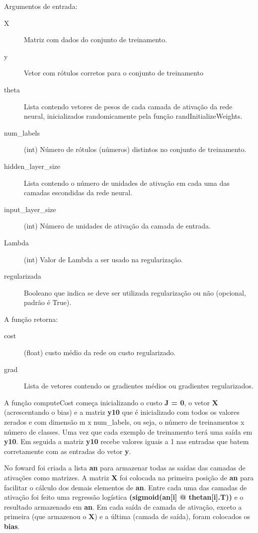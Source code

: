 \documentclass[12pt]{article}
\begin{document}
Argumentos de entrada: 
\begin{description}
\item[X] Matriz com dados do conjunto de treinamento.
\item[y] Vetor com rótulos corretos para o conjunto de treinamento
\item[theta] Lista contendo vetores de pesos de cada camada de ativação da rede neural, inicializados randomicamente pela função randInitializeWeights. 
\item[num\_labels] (int) Número de rótulos (números) distintos no conjunto de treinamento.
\item[hidden\_layer\_size] Lista contendo o número de unidades de ativação em cada uma das camadas escondidas da rede neural.
\item[input\_layer\_size] (int) Número de unidades de ativação da camada de entrada.
\item[Lambda] (int) Valor de Lambda a ser usado na regularização.
\item[regularizada] Booleano que indica se deve ser utilizada regularização ou não (opcional, padrão é True).
\end{description}

A função retorna: 

\begin{description}
\item[cost] (float) custo médio da rede ou custo regularizado.
\item[grad] Lista de vetores contendo os gradientes médios ou gradientes regularizados. 

\end{description}
A função computeCost começa inicializando o custo \textbf{J = 0}, o vetor \textbf{X} (acrescentando o bias) e a matriz \textbf{y10} que é inicializado com todos os valores zerados e com dimensão m x num\_labels, ou seja, o número de treinamentos x número de classes. Uma vez que cada exemplo de treinamento terá uma saída em \textbf{y10}. Em seguida a matriz \textbf{y10} recebe valores iguais a 1 nas entradas que batem corretamente com as entradas do vetor \textbf{y}.

No foward foi criada a lista \textbf{an} para armazenar todas as saídas das camadas de ativações como matrizes. A matriz \textbf{X} foi colocada na primeira posição de \textbf{an} para facilitar o cálculo dos demais elementos de \textbf{an}. Entre cada uma das camadas de ativação foi feito uma regressão logística \textbf{(sigmoid(an[i] @ thetan[i].T))} e o resultado armazenado em \textbf{an}. Em cada saída de camada de ativação, exceto a primeira (que armazenou o \textbf{X}) e a última (camada de saída), foram colocados os \textbf{bias}.
\end{document}

